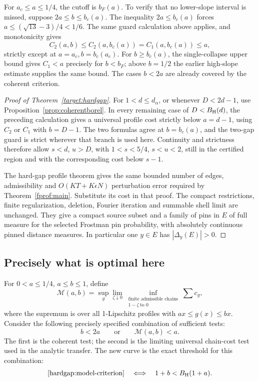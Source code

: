 For \(a_c\le a\le1/4\), the cutoff is \(b_F(a)\). To verify that
no lower-slope interval is missed, suppose \(2a\le b\le b_c(a)\).
The inequality \(2a\le b_c(a)\) forces
\(a\le(\sqrt{13}-3)/4<1/6\). The same guard calculation above applies,
and monotonicity gives
\[
 C_2(a,b)\le C_2(a,b_c(a))=C_1(a,b_c(a))\le a,
\]
strictly except at \(a=a_c,b=b_c(a_c)\).
For \(b\ge b_c(a)\), the single-collapse upper bound gives
\(C_1<a\) precisely for \(b<b_F\); above \(b=1/2\) the earlier
high-slope estimate supplies the same bound. The cases \(b<2a\)
are already covered by the coherent criterion.

\begin{proof}[Proof of Theorem~\ref{target:hardgap}]
For \(1<d\le d_\alpha\), or whenever \(D<2d-1\), use
Proposition~\ref{prop:coherentborel}. In every remaining case of
\(D<B_{\rm H}(d)\), the preceding calculation gives a universal
profile cost strictly below \(a=d-1\), using \(C_2\) or \(C_1\)
with \(b=D-1\). The two formulas agree at \(b=b_c(a)\), and the
two-gap guard is strict wherever that branch is used here.
Continuity and strictness therefore allow \(s<d\), \(u>D\), with
\(1<s<5/4\), \(s<u<2\), still in the certified region and with
the corresponding cost below \(s-1\).

The hard-gap profile theorem gives the same bounded number of edges,
admissibility and \(O(KT+K\epsilon N)\) perturbation error required
by Theorem~\ref{fprof:main}. Substitute its cost in that proof.
The compact restrictions, finite regularization, deletion, Fourier
iteration and summable shell limit are unchanged. They give a compact
source subset and a family of pins in \(E\) of full measure for the
selected Frostman pin probability, with absolutely continuous pinned
distance measures. In particular one
\(y\in E\) has \(|\Delta_y(E)|>0\).
\end{proof}

\subsection{Precisely what is optimal here}
For \(0<a\le1/4\), \(a\le b\le1\), define
\[
 \mathcal M(a,b)=\sup_g\lim_{\zeta\downarrow0}
 \inf_{\substack{\text{finite admissible chains}\\1-\zeta\ \text{to }0}}
       \sum c_g,
\]
where the supremum is over all 1-Lipschitz profiles with
\(ax\le g(x)\le bx\). Consider the following precisely specified
combination of sufficient tests:
\begin{equation}\label{hardgap:model-criterion}
 b<2a\qquad\text{or}\qquad\mathcal M(a,b)<a.
\end{equation}
The first is the coherent test; the second is the limiting universal
chain-cost test used in the analytic transfer. The new curve is the
exact threshold for this combination:
\begin{equation}\label{hardgap:model-optimality}
 \eqref{hardgap:model-criterion}
 \quad\Longleftrightarrow\quad
 1+b<B_{\rm H}(1+a).
\end{equation}

